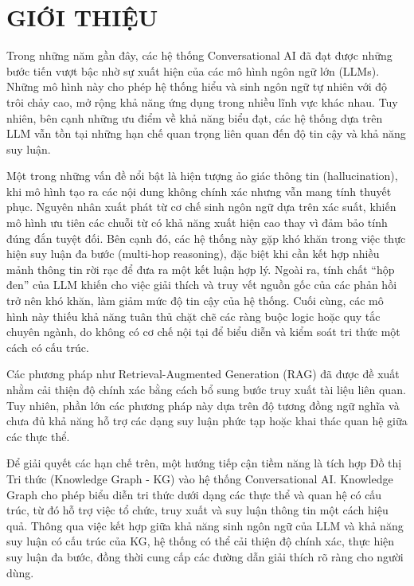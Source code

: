 \documentclass[conference]{IEEEtran}
\begin{document}

\section{GIỚI THIỆU}
Trong những năm gần đây, các hệ thống Conversational AI đã đạt được những bước tiến vượt bậc nhờ sự xuất hiện của các mô hình ngôn ngữ lớn (LLMs). Những mô hình này cho phép hệ thống hiểu và sinh ngôn ngữ tự nhiên với độ trôi chảy cao, mở rộng khả năng ứng dụng trong nhiều lĩnh vực khác nhau. Tuy nhiên, bên cạnh những ưu điểm về khả năng biểu đạt, các hệ thống dựa trên LLM vẫn tồn tại những hạn chế quan trọng liên quan đến độ tin cậy và khả năng suy luận.

Một trong những vấn đề nổi bật là hiện tượng ảo giác thông tin (hallucination), khi mô hình tạo ra các nội dung không chính xác nhưng vẫn mang tính thuyết phục. Nguyên nhân xuất phát từ cơ chế sinh ngôn ngữ dựa trên xác suất, khiến mô hình ưu tiên các chuỗi từ có khả năng xuất hiện cao thay vì đảm bảo tính đúng đắn tuyệt đối. Bên cạnh đó, các hệ thống này gặp khó khăn trong việc thực hiện suy luận đa bước (multi-hop reasoning), đặc biệt khi cần kết hợp nhiều mảnh thông tin rời rạc để đưa ra một kết luận hợp lý. Ngoài ra, tính chất “hộp đen” của LLM khiến cho việc giải thích và truy vết nguồn gốc của các phản hồi trở nên khó khăn, làm giảm mức độ tin cậy của hệ thống. Cuối cùng, các mô hình này thiếu khả năng tuân thủ chặt chẽ các ràng buộc logic hoặc quy tắc chuyên ngành, do không có cơ chế nội tại để biểu diễn và kiểm soát tri thức một cách có cấu trúc.

Các phương pháp như Retrieval-Augmented Generation (RAG) đã được đề xuất nhằm cải thiện độ chính xác bằng cách bổ sung bước truy xuất tài liệu liên quan. Tuy nhiên, phần lớn các phương pháp này dựa trên độ tương đồng ngữ nghĩa và chưa đủ khả năng hỗ trợ các dạng suy luận phức tạp hoặc khai thác quan hệ giữa các thực thể.

Để giải quyết các hạn chế trên, một hướng tiếp cận tiềm năng là tích hợp Đồ thị Tri thức (Knowledge Graph - KG) vào hệ thống Conversational AI. Knowledge Graph cho phép biểu diễn tri thức dưới dạng các thực thể và quan hệ có cấu trúc, từ đó hỗ trợ việc tổ chức, truy xuất và suy luận thông tin một cách hiệu quả. Thông qua việc kết hợp giữa khả năng sinh ngôn ngữ của LLM và khả năng suy luận có cấu trúc của KG, hệ thống có thể cải thiện độ chính xác, thực hiện suy luận đa bước, đồng thời cung cấp các đường dẫn giải thích rõ ràng cho người dùng.
\end{document}
